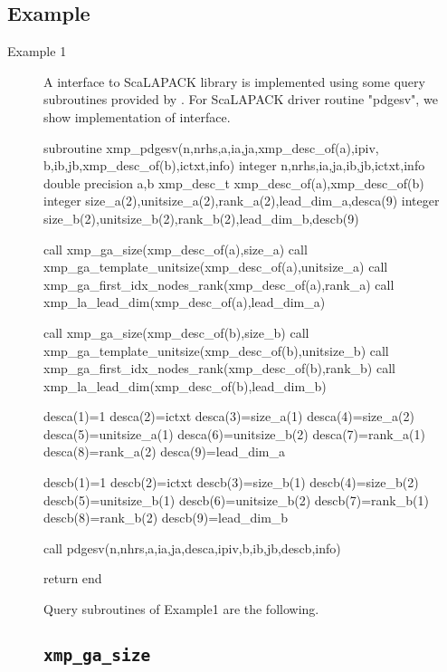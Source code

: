 \subsection*{Example}
\begin{description}

\item[Example 1]
   A {\XMPF} interface to ScaLAPACK library is implemented 
   using some query subroutines provided by {\XMPF}.
   For ScaLAPACK driver routine "pdgesv", we show implementation of {\XMPF} interface.

\begin{XFexample}
      subroutine xmp_pdgesv(n,nrhs,a,ia,ja,xmp_desc_of(a),ipiv,
                      b,ib,jb,xmp_desc_of(b),ictxt,info)
      integer n,nrhs,ia,ja,ib,jb,ictxt,info
      double precision a,b
      xmp_desc_t xmp_desc_of(a),xmp_desc_of(b)
      integer size_a(2),unitsize_a(2),rank_a(2),lead_dim_a,desca(9)
      integer size_b(2),unitsize_b(2),rank_b(2),lead_dim_b,descb(9)
      
      call xmp_ga_size(xmp_desc_of(a),size_a)
      call xmp_ga_template_unitsize(xmp_desc_of(a),unitsize_a)
      call xmp_ga_first_idx_nodes_rank(xmp_desc_of(a),rank_a)
      call xmp_la_lead_dim(xmp_desc_of(a),lead_dim_a)
      
      call xmp_ga_size(xmp_desc_of(b),size_b)
      call xmp_ga_template_unitsize(xmp_desc_of(b),unitsize_b)
      call xmp_ga_first_idx_nodes_rank(xmp_desc_of(b),rank_b)
      call xmp_la_lead_dim(xmp_desc_of(b),lead_dim_b)
      
      desca(1)=1
      desca(2)=ictxt
      desca(3)=size_a(1)
      desca(4)=size_a(2)
      desca(5)=unitsize_a(1)
      desca(6)=unitsize_b(2)
      desca(7)=rank_a(1)
      desca(8)=rank_a(2)
      desca(9)=lead_dim_a
      
      descb(1)=1
      descb(2)=ictxt
      descb(3)=size_b(1)
      descb(4)=size_b(2)
      descb(5)=unitsize_b(1)
      descb(6)=unitsize_b(2)
      descb(7)=rank_b(1)
      descb(8)=rank_b(2)
      descb(9)=lead_dim_b
      
      call pdgesv(n,nhrs,a,ia,ja,desca,ipiv,b,ib,jb,descb,info)
      
      return
      end

\end{XFexample}

Query subroutines of Example1 are the following.

\subsection{\tt xmp\_ga\_size}


\end{description}
